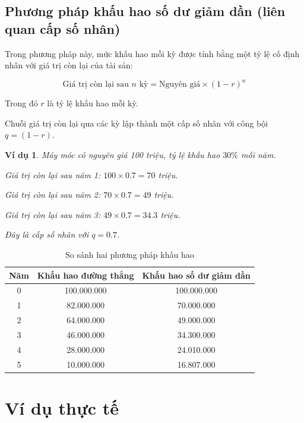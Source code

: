 \documentclass[12pt,a4paper]{report}
\newtheorem{example}{Ví dụ}[section]
\begin{document}
\subsection{Phương pháp khấu hao số dư giảm dần (liên quan cấp số nhân)}

Trong phương pháp này, mức khấu hao mỗi kỳ được tính bằng một tỷ lệ cố định nhân với giá trị còn lại của tài sản:

\[
    \text{Giá trị còn lại sau } n \text{ kỳ}
    =
    \text{Nguyên giá} \times (1 - r)^n
\]

Trong đó $r$ là tỷ lệ khấu hao mỗi kỳ.

Chuỗi giá trị còn lại qua các kỳ lập thành một cấp số nhân với công bội $q = (1 - r)$.

\begin{example}
    Máy móc có nguyên giá 100 triệu, tỷ lệ khấu hao $30\%$ mỗi năm.
    
    Giá trị còn lại sau năm 1:
    $100 \times 0.7 = 70$ triệu.
    
    Giá trị còn lại sau năm 2:
    $70 \times 0.7 = 49$ triệu.
    
    Giá trị còn lại sau năm 3:
    $49 \times 0.7 = 34.3$ triệu.
    
    Đây là cấp số nhân với $q = 0.7$.
\end{example}

\begin{table}[htbp]
    \centering
    \caption{So sánh hai phương pháp khấu hao}
    
    \begin{tabular}{|c|c|c|}
        \hline
        \textbf{Năm} &
        \textbf{Khấu hao đường thẳng} &
        \textbf{Khấu hao số dư giảm dần} \\
        \hline
        0 & 100.000.000 & 100.000.000 \\
        \hline
        1 & 82.000.000 & 70.000.000 \\
        \hline
        2 & 64.000.000 & 49.000.000 \\
        \hline
        3 & 46.000.000 & 34.300.000 \\
        \hline
        4 & 28.000.000 & 24.010.000 \\
        \hline
        5 & 10.000.000 & 16.807.000 \\
        \hline
    \end{tabular}
\end{table}

\section{Ví dụ thực tế}
\end{document}
